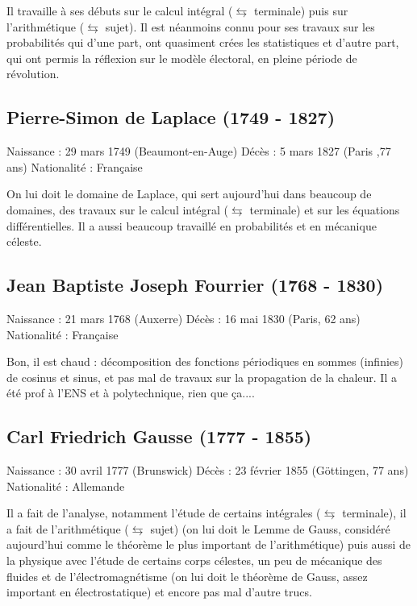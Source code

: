Il travaille à ses débuts sur le calcul intégral ($\leftrightarrows$ terminale) puis sur l'arithmétique ($\leftrightarrows$ sujet). Il est néanmoins connu pour ses travaux sur les probabilités qui d'une part, ont quasiment crées les statistiques et d'autre part, qui ont permis la réflexion sur le modèle électoral, en pleine période de révolution.

\subsection*{Pierre-Simon de Laplace (1749 - 1827)}
Naissance : 29 mars 1749 (Beaumont-en-Auge)\newline
Décès : 5 mars 1827 (Paris ,77 ans)\newline
Nationalité : Française\newline


On lui doit le domaine de Laplace, qui sert aujourd'hui dans beaucoup de domaines, des travaux sur le calcul intégral ($\leftrightarrows$ terminale) et sur les équations différentielles. Il a aussi beaucoup travaillé en probabilités et en mécanique céleste.

\subsection*{Jean Baptiste Joseph Fourrier (1768 - 1830)}
Naissance : 21 mars 1768 (Auxerre)\newline
Décès : 16 mai 1830 (Paris, 62 ans)\newline
Nationalité : Française\newline


Bon, il est chaud : décomposition des fonctions périodiques en sommes (infinies) de cosinus et sinus, et pas mal de travaux sur la propagation de la chaleur. Il a été prof à l'ENS et à polytechnique, rien que ça....

\subsection*{Carl Friedrich Gausse (1777 - 1855)}
Naissance : 30 avril 1777 (Brunswick)\newline
Décès : 23 février 1855 (Göttingen, 77 ans)\newline
Nationalité : Allemande \newline

Il a fait de l'analyse, notamment l'étude de certains intégrales ($\leftrightarrows$ terminale), il a fait de l'arithmétique ($\leftrightarrows$ sujet) (on lui doit le Lemme de Gauss, considéré aujourd'hui comme le théorème le plus important de l'arithmétique) puis aussi de la physique avec l'étude de certains corps célestes, un peu de mécanique des fluides et de l'électromagnétisme (on lui doit le théorème de Gauss, assez important en électrostatique) et encore pas mal d'autre trucs.

